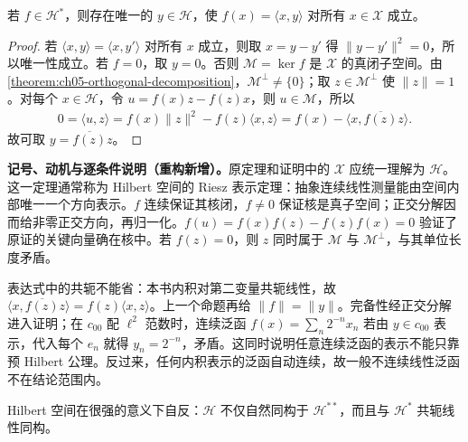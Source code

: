 \documentclass[../../main.tex]{subfiles}
\begin{document}
\begin{theorem}\label{theorem:ch05-riesz-hilbert}
若 $f\in\mathscr H^*$，则存在唯一的 $y\in\mathscr H$，使 $f(x)=\langle x,y\rangle$ 对所有 $x\in\mathscr X$ 成立。
\end{theorem}
\begin{proof}
若 $\langle x,y\rangle=\langle x,y'\rangle$ 对所有 $x$ 成立，则取 $x=y-y'$ 得 $\|y-y'\|^2=0$，所以唯一性成立。若 $f=0$，取 $y=0$。否则 $\mathscr M=\ker f$ 是 $\mathscr X$ 的真闭子空间。由\cref{theorem:ch05-orthogonal-decomposition}，$\mathscr M^\perp\ne\{0\}$；取 $z\in\mathscr M^\perp$ 使 $\|z\|=1$。对每个 $x\in\mathscr H$，令 $u=f(x)z-f(z)x$，则 $u\in\mathscr M$，所以
\begin{align*}
0=\langle u,z\rangle
=f(x)\|z\|^2-f(z)\langle x,z\rangle
=f(x)-\langle x,\overline{f(z)}z\rangle.
\end{align*}
故可取 $y=\overline{f(z)}z$。
\end{proof}
\begin{remark}
\textbf{记号、动机与逐条件说明（重构新增）。}原定理和证明中的 $\mathscr X$ 应统一理解为 $\mathscr H$。这一定理通常称为 Hilbert 空间的 Riesz 表示定理：抽象连续线性测量能由空间内部唯一一个方向表示。$f$ 连续保证其核闭，$f\ne0$ 保证核是真子空间；正交分解因而给非零正交方向，再归一化。$f(u)=f(x)f(z)-f(z)f(x)=0$ 验证了原证的关键向量确在核中。若 $f(z)=0$，则 $z$ 同时属于 $\mathscr M$ 与 $\mathscr M^\perp$，与其单位长度矛盾。

表达式中的共轭不能省：本书内积对第二变量共轭线性，故 $\langle x,\overline{f(z)}z\rangle=f(z)\langle x,z\rangle$。上一个命题再给 $\|f\|=\|y\|$。完备性经正交分解进入证明；在 $c_{00}$ 配 $\ell^2$ 范数时，连续泛函 $f(x)=\sum_n2^{-n}x_n$ 若由 $y\in c_{00}$ 表示，代入每个 $e_n$ 就得 $y_n=2^{-n}$，矛盾。这同时说明任意连续泛函的表示不能只靠预 Hilbert 公理。反过来，任何内积表示的泛函自动连续，故一般不连续线性泛函不在结论范围内。
\end{remark}
\begin{corollary}\label{corollary:ch05-hilbert-reflexive}
Hilbert 空间在很强的意义下自反：$\mathscr H$ 不仅自然同构于 $\mathscr H^{**}$，而且与 $\mathscr H^*$ 共轭线性同构。
\end{corollary}
\end{document}
